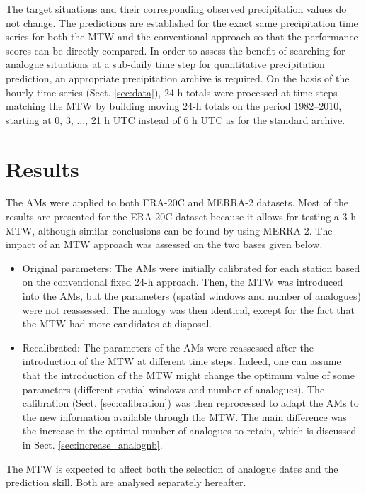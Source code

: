 \documentclass[hess, manuscript]{copernicus}
\begin{document}
	The target situations and their corresponding observed precipitation values do not change. The predictions are established for the exact same precipitation time series for both the MTW and the conventional approach so that the performance scores can be directly compared. In order to assess the benefit of searching for analogue situations at a sub-daily time step for quantitative precipitation prediction, an appropriate precipitation archive is required. On the basis of the hourly time series (Sect. \ref{sec:data}), 24-h totals were processed at time steps matching the MTW by building moving 24-h totals on the period 1982--2010, starting at 0, 3, ..., 21 h UTC instead of 6 h UTC as for the standard archive.
	
	
	\section{Results}
	\label{sec:results}
	
	The AMs were applied to both ERA-20C and MERRA-2 datasets. Most of the results are presented for the ERA-20C dataset because it allows for testing a 3-h MTW, although similar conclusions can be found by using MERRA-2. The impact of an MTW approach was assessed on the two bases given below.
	\begin{itemize}
		\item Original parameters: The AMs were initially calibrated for each station based on the conventional fixed 24-h approach. Then, the MTW was introduced into the AMs, but the parameters (spatial windows and number of analogues) were not reassessed. The analogy was then identical, except for the fact that the MTW had more candidates at disposal.
		\item Recalibrated: The parameters of the AMs were reassessed after the introduction of the MTW at different time steps. Indeed, one can assume that the introduction of the MTW might change the optimum value of some parameters (different spatial windows and number of analogues). The calibration (Sect. \ref{sec:calibration}) was then reprocessed to adapt the AMs to the new information available through the MTW. The main difference was the increase in the optimal number of analogues to retain, which is discussed in Sect. \ref{sec:increase_analognb}.
	\end{itemize}
	
	The MTW is expected to affect both the selection of analogue dates and the prediction skill. Both are analysed separately hereafter.
	
\end{document}

